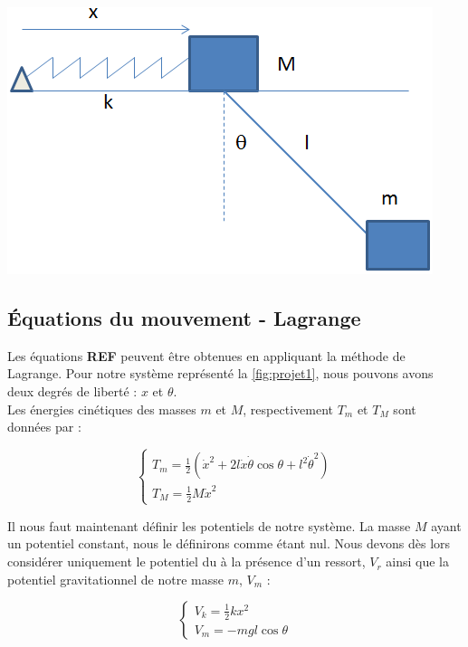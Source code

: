 \begin{center}
\includegraphics[scale=0.7]{intro/image1.png}
\label{fig:projet1}
\end{center}


\newpage
\subsection{Équations du mouvement - Lagrange}
Les équations \textbf{REF} peuvent être obtenues en appliquant la méthode de Lagrange. Pour notre
système représenté la \autoref{fig:projet1}, nous pouvons avons deux degrés de liberté : $x$ et 
$\theta$.\\
Les énergies cinétiques des masses $m$ et $M$, respectivement $T_m$ et $T_M$ sont données par :

    \begin{equation}
        \left\{\begin{array}{l}
         T_m = \frac{1}{2}(\dot{x}^2 + 2l\dot{x}\dot{\theta}\cos\theta + l^2\dot{\theta}^2) \\
         T_M = \frac{1}{2}M\dot{x}^2
        \end{array}\right.
    \end{equation}
    
Il nous faut maintenant définir les potentiels de notre système. La masse $M$ ayant un potentiel 
constant, nous le définirons comme étant nul. Nous devons dès lors considérer uniquement le potentiel
du à la présence d'un ressort, $V_r$ ainsi que la potentiel gravitationnel de notre masse $m$, $V_m$ :


    \begin{equation}
        \left\{\begin{array}{l}
         V_k = \frac{1}{2}kx^2 \\
         V_m = -mgl\cos\theta
        \end{array}\right.
    \end{equation}

